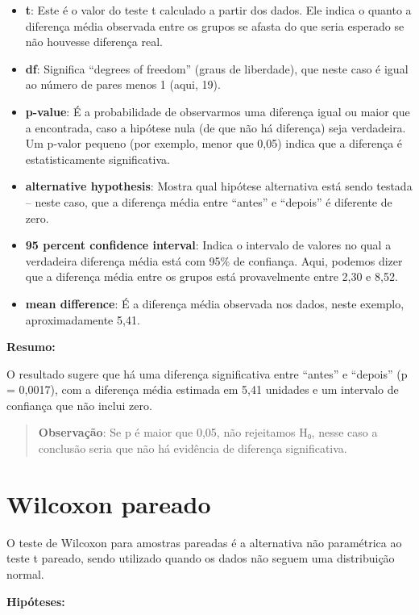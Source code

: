 \documentclass[
]{book}
\providecommand{\tightlist}{%
  \setlength{\itemsep}{0pt}\setlength{\parskip}{0pt}}
\begin{document}
\begin{itemize}
\tightlist
\item
  \textbf{t}: Este é o valor do teste t calculado a partir dos dados. Ele indica o quanto a diferença média observada entre os grupos se afasta do que seria esperado se não houvesse diferença real.
\item
  \textbf{df}: Significa ``degrees of freedom'' (graus de liberdade), que neste caso é igual ao número de pares menos 1 (aqui, 19).
\item
  \textbf{p-value}: É a probabilidade de observarmos uma diferença igual ou maior que a encontrada, caso a hipótese nula (de que não há diferença) seja verdadeira. Um p-valor pequeno (por exemplo, menor que 0,05) indica que a diferença é estatisticamente significativa.
\item
  \textbf{alternative hypothesis}: Mostra qual hipótese alternativa está sendo testada -- neste caso, que a diferença média entre ``antes'' e ``depois'' é diferente de zero.
\item
  \textbf{95 percent confidence interval}: Indica o intervalo de valores no qual a verdadeira diferença média está com 95\% de confiança. Aqui, podemos dizer que a diferença média entre os grupos está provavelmente entre 2,30 e 8,52.
\item
  \textbf{mean difference}: É a diferença média observada nos dados, neste exemplo, aproximadamente 5,41.
\end{itemize}

\textbf{Resumo:}

O resultado sugere que há uma diferença significativa entre ``antes'' e ``depois'' (p = 0,0017), com a diferença média estimada em 5,41 unidades e um intervalo de confiança que não inclui zero.

\begin{quote}
\textbf{Observação}: Se p é maior que 0,05, não rejeitamos H₀, nesse caso a conclusão seria que não há evidência de diferença significativa.
\end{quote}

\section{Wilcoxon pareado}\label{wilcoxon-pareado}

O teste de Wilcoxon para amostras pareadas é a alternativa não paramétrica ao teste t pareado, sendo utilizado quando os dados não seguem uma distribuição normal.

\textbf{Hipóteses:}
\end{document}
